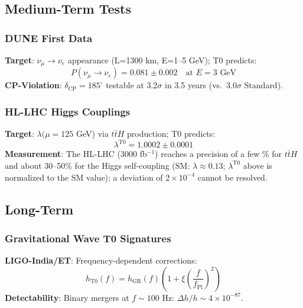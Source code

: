 	\subsection{Medium-Term Tests}
	
	\subsubsection{DUNE First Data}
	
	\textbf{Target}: $\nu_\mu \to \nu_e$ appearance (L=1300 km, E=1--5 GeV); T0 predicts:
	\begin{equation}
		P(\nu_\mu \to \nu_e) = 0.081 \pm 0.002 \quad \text{at } E=3 \text{ GeV} \tag{ML-Eq.~6.2}
	\end{equation}
	\textbf{CP-Violation}: $\delta_{\text{CP}} = 185^\circ$ testable at 3.2$\sigma$ in 3.5 years (vs.~3.0$\sigma$ Standard).
	
	\subsubsection{HL-LHC Higgs Couplings}
	
	\textbf{Target}: $\lambda(\mu=125$ GeV) via $t\bar{t}H$ production; T0 predicts:
	\begin{equation}
		\lambda^{\text{T0}} = 1.0002 \pm 0.0001 \tag{ML-Eq.~6.3}
	\end{equation}
	\textbf{Measurement}: The HL-LHC (3000 fb$^{-1}$) reaches a precision of a few \% for $t\bar{t}H$ and about 30--50\% for the Higgs self-coupling (SM: $\lambda \approx 0.13$; $\lambda^{\text{T0}}$ above is normalized to the SM value); a deviation of $2\times10^{-4}$ cannot be resolved.
	
	\subsection{Long-Term}
	
	\subsubsection{Gravitational Wave T0 Signatures}
	
	\textbf{LIGO-India/ET}: Frequency-dependent corrections:
	\begin{equation}
		h_{\text{T0}}(f) = h_{\text{GR}}(f) \left(1 + \xi \left(\frac{f}{f_{\text{Pl}}}\right)^2\right) \tag{T0-Orig Eq.~8.1.2}
	\end{equation}
	\textbf{Detectability}: Binary mergers at $f\sim100$ Hz: $\Delta h/h \sim 4\times10^{-87}$.
	
